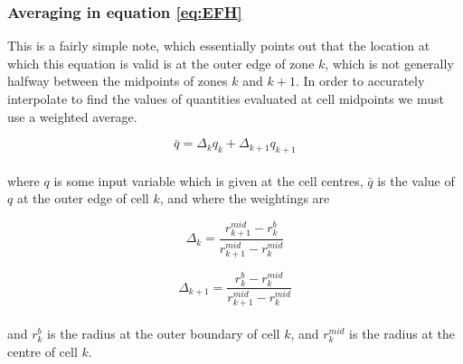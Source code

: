 \documentclass[11pt]{amsart}
\begin{document}
\subsubsection{Averaging in equation \ref{eq:EFH}}

This is a fairly simple note, which essentially points out that the location at which this equation is valid is at the outer edge of zone $k$, which is not generally halfway between the midpoints of zones $k$ and $k+1$.  In order to accurately interpolate to find the values of quantities evaluated at cell midpoints we must use a weighted average.

\begin{equation} \label{eq:weighted_average}
\bar{q}  =  \Delta_{k} q_{k}  +  \Delta_{k+1} q_{k+1}
\end{equation}
\\
where $q$ is some input variable which is given at the cell centres, $\bar{q}$ is the value of $q$ at the outer edge of cell $k$, and where the weightings are

\begin{equation} \label{eq:delta_k}
\Delta_{k} =  \frac{r^{mid}_{k+1} - r^{b}_{k}}{r^{mid}_{k+1} - r^{mid}_{k}}
\end{equation}

\begin{equation} \label{eq:delta_k+1}
\Delta_{k+1} =  \frac{r^{b}_{k} - r^{mid}_{k}}{r^{mid}_{k+1} - r^{mid}_{k}}
\end{equation}
\\
and $r^{b}_{k}$ is the radius at the outer boundary of cell $k$, and $r^{mid}_{k}$ is the radius at the centre of cell $k$.
\end{document}
